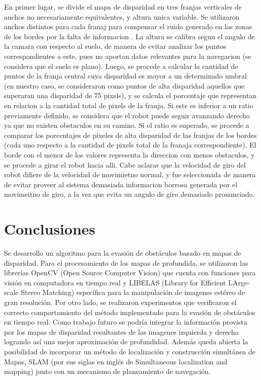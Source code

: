 \documentclass[journal]{IEEEtran}
\begin{document}
En primer lugar, se divide el mapa de disparidad en tres franjas verticales de anchos no necesariamente equivalentes, y altura unica variable. Se utilizaron anchos distintos para cada franaj para compensar el ruido generado en las zonas de los bordes por la falta de informacion . La altura se calibra segun el angulo de la camara con respecto al suelo, de manera de evitar analizar los puntos correspondientes a este, pues no aportan datos relevantes para la navegacion (se considera que el suelo es plano).  Luego, se procede a calcular la cantidad de puntos de la franja central cuya disparidad es mayor a un determinado umbral (en nuestro caso, se consideraron como puntos de alta disparidad aquellos que superaran una disparidad de 75 pixels), y se calcula el porcentaje que representan en relacion a la cantidad total de pixels de la franja. Si este es inferior a un ratio previamente definido, se considera que el robot puede seguir avanzando derecho ya que no existen obstaculos en su camino. Si el ratio es superado, se procede a comparar los porcentajes de pixeles de alta disparidad de las franjas de los bordes (cada uno respecto a la cantidad de pixels total de la franaja correspondiente). El borde con el menor de los valores representa la direccion con menos obstaculos, y se procede a girar el robot hacia alli. 
Cabe aclarar que la velocidad de giro del robot difiere de la velocidad de movimietno normal, y fue seleccionada de manera de evitar proveer al sistema demasiada informacion borrosa generada por el movimeitno de giro, a la vez que evita un angulo de giro demasiado pronunciado.

\section{Conclusiones}
\label{sec:conclusiones}
Se desarrollo un algoritmo para la evasi\'on de obst\'aculos basado en mapas de disparidad. Para el procesamiento de los mapas de profundida, se utilizaron las librer\'ias OpenCV (Open Source Computer Vision) que cuenta con funciones para visi\'on en computadora en tiempo real y LIBELAS (Library for Efficient LArge-scale Stereo Matching) espec\'ifica para la manipulaci\'on de imagenes est\'ereo de gran resoluci\'on. Por otro lado, se realizaron experimentos que verificaron el correcto comportamiento del m\'etodo implementado para la evasi\'on de obst\'aculos en tiempo real. Como trabajo futuro se podr\'ia integrar la informaci\'on provista por los mapas de disparidad resultantes de las imagenes izquierda y derecha logrando as\'i una mejor aproximaci\'on de profundidad. Adem\'as queda abierta la posibilidad de incorporar un m\'etodo de localizaci\'on y construcci\'on simult\'anea de Mapas, SLAM (por sus siglas en ingl\'es de Simultaneous localization and mapping) junto con un mecanismo de planeamiento de navegaci\'on.
\end{document}

